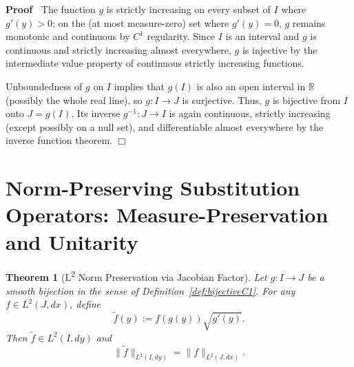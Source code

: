 \documentclass{article}
\newcommand{\assign}{:=}
\newcommand{\tmrsup}[1]{\textsuperscript{#1}}
\newenvironment{proof}{\noindent\textbf{Proof\ }}{\hspace*{\fill}$\Box$\medskip}
\newtheorem{theorem}{Theorem}
\begin{document}
\begin{proof}
  The function $g$ is strictly increasing on every subset of $I$ where $g' (y)
  > 0$; on the (at most measure-zero) set where $g' (y) = 0$, $g$ remains
  monotonic and continuous by $C^1$ regularity. Since $I$ is an interval and
  $g$ is continuous and strictly increasing almost everywhere, $g$ is
  injective by the intermediate value property of continuous strictly
  increasing functions.
  
  Unboundedness of $g$ on $I$ implies that $g (I)$ is also an open interval in
  $\mathbb{R}$ (possibly the whole real line), so $g : I \to J$ is surjective.
  Thus, $g$ is bijective from $I$ onto $J = g (I)$. Its inverse $g^{- 1} : J
  \to I$ is again continuous, strictly increasing (except possibly on a null
  set), and differentiable almost everywhere by the inverse function theorem.
\end{proof}

\section{Norm-Preserving Substitution Operators: Measure-Preservation and
Unitarity}

\begin{theorem}
  [L\tmrsup{2} Norm Preservation via Jacobian Factor]\label{thm:L2_jacobian}
  Let $g : I \to J$ be a smooth bijection in the sense of
  Definition~\ref{def:bijectiveC1}. For any $f \in L^2 (J, dx)$, define
  \begin{equation}
    \label{eq:transformationdef} \tilde{f} (y) \assign f (g (y)) \sqrt{g' (y)}
    .
  \end{equation}
  Then $\tilde{f} \in L^2 (I, dy)$ and
  \begin{equation}
    \label{eq:L2normpres} \| \tilde{f} \|_{L^2 (I, dy)} = \|f\|_{L^2 (J, dx)}
    .
  \end{equation}
\end{theorem}
\end{document}
